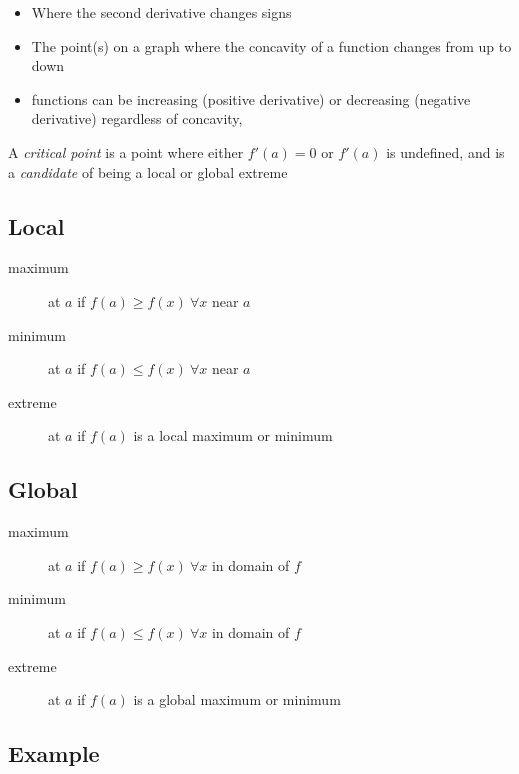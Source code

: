 \hformbar




\begin{itemize}
    \item Where the second derivative changes signs
    \item The point(s) on a graph where the concavity of a function changes from up to down
    \item functions can be increasing (positive derivative) or decreasing (negative derivative) regardless of concavity,
\end{itemize}
\hformbar







A \textit{critical point} is a point where either $f'(a) = 0$ or $f'(a)$ is undefined, and is a \textit{candidate} of being a local or global extreme

\subsection*{Local}

\begin{description}
    \item[maximum] at $a$ if $f(a) \geq f(x)~ \forall x$ near $a$
    \item[minimum] at $a$ if $f(a) \leq f(x)~ \forall x$ near $a$
    \item[extreme] at $a$ if $f(a)$ is a local maximum or minimum
\end{description}
    
\subsection*{Global}

\begin{description}
    \item[maximum] at $a$ if $f(a) \geq f(x)~ \forall x$ in domain of $f$
    \item[minimum] at $a$ if $f(a) \leq f(x)~ \forall x$ in domain of $f$
    \item[extreme] at $a$ if $f(a)$ is a global maximum or minimum
\end{description}

\subsection*{Example}

